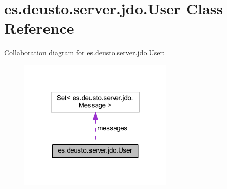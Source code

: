 \hypertarget{classes_1_1deusto_1_1server_1_1jdo_1_1_user}{}\section{es.\+deusto.\+server.\+jdo.\+User Class Reference}
\label{classes_1_1deusto_1_1server_1_1jdo_1_1_user}


Collaboration diagram for es.\+deusto.\+server.\+jdo.\+User\+:
\nopagebreak
\begin{figure}[H]
\begin{center}
\leavevmode
\includegraphics[width=211pt]{classes_1_1deusto_1_1server_1_1jdo_1_1_user__coll__graph}
\end{center}
\end{figure}
